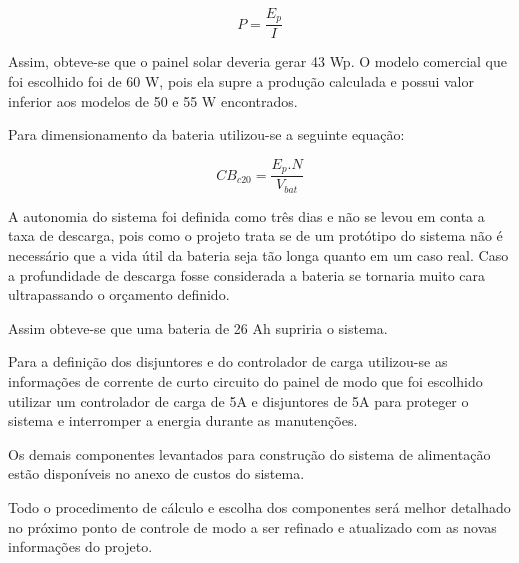 \begin{equation}
P = \dfrac{E_p}{I}
\end{equation}

Assim, obteve-se que o painel solar deveria gerar 43 Wp. O modelo comercial que foi escolhido foi de 60 W, pois ela supre a produção calculada e possui valor inferior aos modelos de 50 e 55 W encontrados.

Para dimensionamento da bateria utilizou-se a seguinte equação:

\begin{equation}
CB_{c20} = \dfrac{E_p . N}{V_{bat}}
\end{equation} 

A autonomia do sistema foi definida como três dias e não se levou em conta a taxa de descarga, pois como o projeto trata se de um protótipo do sistema não é necessário que a vida útil da bateria seja tão longa quanto em um caso real. Caso a profundidade de descarga fosse considerada a bateria se tornaria muito cara ultrapassando o orçamento definido. 

Assim obteve-se que uma bateria de 26 Ah supriria o sistema.

Para a definição dos disjuntores e do controlador de carga utilizou-se as informações de corrente de curto circuito do painel de modo que foi escolhido utilizar um controlador de carga de 5A e disjuntores de 5A para proteger o sistema e interromper a energia durante as manutenções. 

Os demais componentes levantados para construção do sistema de alimentação estão disponíveis no anexo de custos do sistema.

Todo o procedimento de cálculo e escolha dos componentes será melhor detalhado no próximo ponto de controle de modo a ser refinado e atualizado com as novas informações do projeto.













